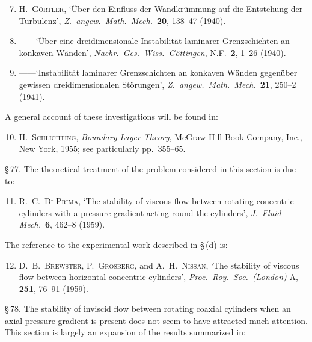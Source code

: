 \begin{enumerate}\setcounter{enumi}{6}
\item H.~\textsc{G\"ortler}, `\"Uber den Einfluss der Wandkr\"ummung auf die Entstehung der Turbulenz', \emph{Z.\ angew.\ Math.\ Mech.}\ \textbf{20}, 138--47 (1940).

\item ------\quad `\"Uber eine dreidimensionale Instabilit\"at laminarer Grenzschichten an konkaven W\"anden', \emph{Nachr.\ Ges.\ Wiss.\ G\"ottingen}, N.F.\ \textbf{2}, 1--26 (1940).

\item ------\quad `Instabilit\"at laminarer Grenzschichten an konkaven W\"anden gegen\"uber gewissen dreidimensionalen St\"orungen', \emph{Z.\ angew.\ Math.\ Mech.}\ \textbf{21}, 250--2 (1941).
\end{enumerate}

\noindent A general account of these investigations will be found in:

\begin{enumerate}\setcounter{enumi}{9}
\item H.~\textsc{Schlichting}, \emph{Boundary Layer Theory}, McGraw-Hill Book Company, Inc., New York, 1955; see particularly pp.~355--65.
\end{enumerate}

\medskip
\noindent\S\,77. The theoretical treatment of the problem considered in this section is due to:

\begin{enumerate}\setcounter{enumi}{10}
\item R.~C.~\textsc{Di Prima}, `The stability of viscous flow between rotating concentric cylinders with a pressure gradient acting round the cylinders', \emph{J.\ Fluid Mech.}\ \textbf{6}, 462--8 (1959).
\end{enumerate}

\noindent The reference to the experimental work described in \S\,(d) is:

\begin{enumerate}\setcounter{enumi}{11}
\item D.~B.~\textsc{Brewster}, P.~\textsc{Grosberg}, and A.~H.~\textsc{Nissan}, `The stability of viscous flow between horizontal concentric cylinders', \emph{Proc.\ Roy.\ Soc.\ (London)} A, \textbf{251}, 76--91 (1959).
\end{enumerate}

\medskip
\noindent\S\,78. The stability of inviscid flow between rotating coaxial cylinders when an axial pressure gradient is present does not seem to have attracted much attention. This section is largely an expansion of the results summarized in:

